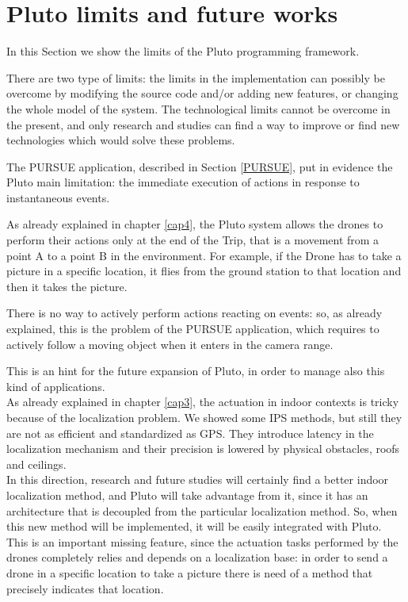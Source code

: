 \newpage

\section{Pluto limits and future works}

In this Section we show the limits of the Pluto programming framework.

There are two type of limits:
the limits in the implementation can possibly be overcome by modifying the source code and/or adding new features, or changing the whole model of the system.
The technological limits cannot be overcome in the present, and only research and studies can find a way to improve or find new technologies which would solve these problems.


The PURSUE application, described in Section \ref{PURSUE}, put in evidence the Pluto main limitation: the immediate execution of actions in response to instantaneous events.

As already explained in chapter \ref{cap4}, the Pluto system allows the drones to perform their actions only at the end of the Trip, that is a movement from a point A to a point B in the environment.
For example, if the Drone has to take a picture in a specific location, it flies from the ground station to that location and then it takes the picture.

There is no way to actively perform actions reacting on events:
so, as already explained, this is the problem of the PURSUE application, which requires to actively follow a moving object when it enters in the camera range.

This is an hint for the future expansion of Pluto, in order to manage also this kind of applications.
\\

As already explained in chapter \ref{cap3}, the actuation in indoor contexts is tricky because of the localization problem.
We showed some IPS methods, but still they are not as efficient and standardized as GPS.
They introduce latency in the localization mechanism and their precision is lowered by physical obstacles, roofs and ceilings.
\\

In this direction, research and future studies will certainly find a better indoor localization method, and Pluto will take advantage from it, since it has an architecture that is decoupled from the particular localization method.
So, when this new method will be implemented, it will be easily integrated with Pluto.
This is an important missing feature, since the actuation tasks performed by the drones completely relies and depends on a localization base:
in order to send a drone in a specific location to take a picture there is need of a method that precisely indicates that location.
\\


